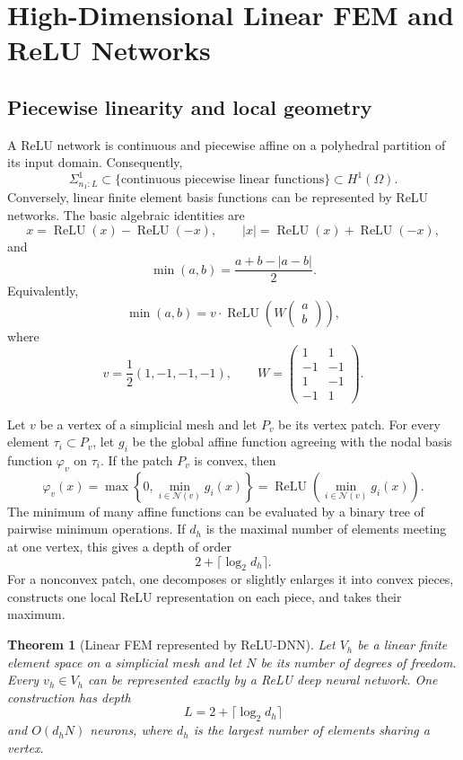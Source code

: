 \documentclass[11pt,a4paper]{article}
\newcommand{\ReLU}{\operatorname{ReLU}}
\theoremstyle{definition}
\theoremstyle{plain}
\newtheorem{theorem}{Theorem}[section]
\theoremstyle{remark}
\theoremstyle{plain}
\begin{document}
\section{High-Dimensional Linear FEM and ReLU Networks}

\subsection{Piecewise linearity and local geometry}
A ReLU network is continuous and piecewise affine on a polyhedral partition of its input domain. Consequently,
\[
  \Sigma^1_{n_1:L}\subset \{\text{continuous piecewise linear functions}\}\subset H^1(\Omega).
\]
Conversely, linear finite element basis functions can be represented by ReLU networks. The basic algebraic identities are
\[
  x=\ReLU(x)-\ReLU(-x),
  \qquad
  |x|=\ReLU(x)+\ReLU(-x),
\]
and
\[
  \min(a,b)=\frac{a+b-|a-b|}{2}.
\]
Equivalently,
\[
  \min(a,b)=v\cdot\ReLU\!\left(W\begin{pmatrix}a\\b\end{pmatrix}\right),
\]
where
\[
  v=\frac12(1,-1,-1,-1),
  \qquad
  W=
  \begin{pmatrix}
  1&1\\
  -1&-1\\
  1&-1\\
  -1&1
  \end{pmatrix}.
\]

Let $v$ be a vertex of a simplicial mesh and let $P_v$ be its vertex patch. For every element $\tau_i\subset P_v$, let $g_i$ be the global affine function agreeing with the nodal basis function $\varphi_v$ on $\tau_i$. If the patch $P_v$ is convex, then
\[
  \varphi_v(x)=\max\left\{0,\min_{i\in\mathcal N(v)}g_i(x)\right\}
  =\ReLU\left(\min_{i\in\mathcal N(v)}g_i(x)\right).
\]
The minimum of many affine functions can be evaluated by a binary tree of pairwise minimum operations. If $d_h$ is the maximal number of elements meeting at one vertex, this gives a depth of order
\[
  2+\lceil\log_2d_h\rceil.
\]
For a nonconvex patch, one decomposes or slightly enlarges it into convex pieces, constructs one local ReLU representation on each piece, and takes their maximum.

\begin{theorem}[Linear FEM represented by ReLU-DNN]
Let $V_h$ be a linear finite element space on a simplicial mesh and let $N$ be its number of degrees of freedom. Every $v_h\in V_h$ can be represented exactly by a ReLU deep neural network. One construction has depth
\[
  L=2+\lceil\log_2d_h\rceil
\]
and $O(d_hN)$ neurons, where $d_h$ is the largest number of elements sharing a vertex.
\end{theorem}
\end{document}
